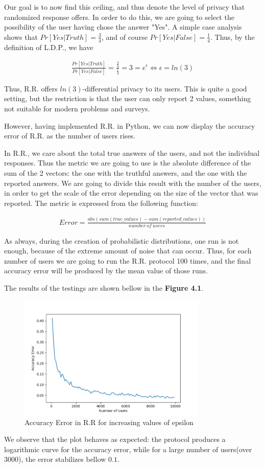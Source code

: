 Our goal is to now find this ceiling, and thus denote the level of privacy that randomized response offers. In order to do this, we are going to select the possibility of the user having chose the answer "Yes". A simple case analysis shows that $Pr[Yes | Truth] = \frac{3}{4}$, and of course $Pr[Yes | False] = \frac{1}{4}$. Thus, by the definition of L.D.P., we have 

\begin{align*}
    \frac{Pr[Yes | Truth]}{Pr[Yes | False]} = \frac{\frac{3}{4}}{\frac{1}{4}} = 3 = e^\epsilon \Longleftrightarrow \epsilon = ln(3)
\end{align*}

Thus, R.R. offers  $ln(3)$-differential privacy to its users. This is quite a good setting, but the restriction is that the user can only report 2 values, something not suitable for modern problems and surveys. 

However, having implemented R.R. in Python, we can now display the accuracy error of R.R. as the number of users rises.

In R.R., we care about the total true answers of the users, and not the individual responses. Thus the metric we are going to use is the absolute difference of the sum of the 2 vectors: the one with the truthful answers, and the one with the reported answers. We are going to divide this result with the number of the users, in order to get the scale of the error depending on the size of the vector that was reported. The metric is expressed from the following function:

\begin{align*}
    Error = \frac{abs(sum(true\_values) - sum(reported\_values)) }{number\ of \ users}
\end{align*}

As always, during the creation of probabilistic distributions, one run is not enough, because of the extreme amount of noise that can occur. Thus, for each number of users we are going to run the R.R. protocol 100 times, and the final accuracy error will be produced by the mean value of those runs.

The results of the testings are shown bellow in the \textbf{Figure 4.1}.

\begin{figure}[!htb]\centering
    \includegraphics[width=0.8\textwidth]{images/rr_results.png}
    \caption{Accuracy Error in R.R for increasing values of epsilon}
\end{figure}


We observe that the plot behaves as expected: the protocol produces a logarithmic curve for the accuracy error, while for a large number of users(over 3000), the error stabilizes bellow $0.1$. 